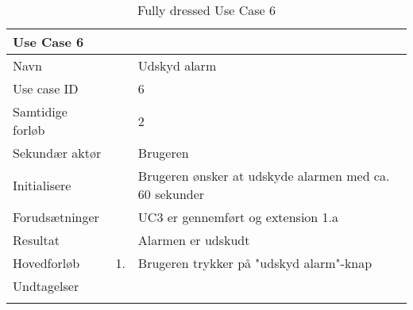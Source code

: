 \begin{longtabu} to  %
    {\large \textbf{Use Case 6}} && \\
    \toprule
    Navn &&    Udskyd alarm\\
    Use case ID &&    6\\
    Samtidige forløb &&    2\\
    Sekundær aktør &&   Brugeren \\
    Initialisere &&    Brugeren ønsker at udskyde alarmen med ca. 60 sekunder \\
    Forudsætninger && UC3 er gennemført og extension 1.a\\
    Resultat &&    Alarmen er udskudt                  \\ \midrule
    Hovedforløb &    1. &    Brugeren trykker på "udskyd alarm"\--knap  \\  		
    Undtagelser &     \\ \bottomrule
\caption{Fully dressed Use Case 6}
\label{UC6}
\end{longtabu}


